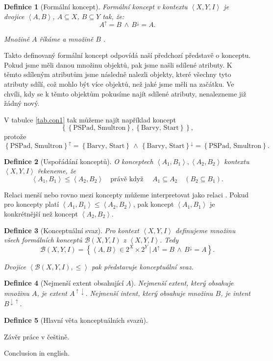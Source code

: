 \documentclass[12pt]{article}
\newcommand{\sep}{\,|\,}
\newcommand{\pravekdyz}{\mbox{právě když }}
\newcommand{\adds}[1]{\left\{#1\right\}}
\newcommand{\addsp}[1]{\left<#1\right>}
\newcommand{\logand}{\,\wedge\,}
\newcommand{\context}{\addsp{X, Y, I}}
\newcommand{\lattice}{\mathcal{B}(X, Y, I)}
\newcommand{\AB}{\addsp{A, B}}
\newcommand{\up}{^{\uparrow}}
\newcommand{\down}{^{\downarrow}}
\newcommand{\updown}{^{\uparrow\downarrow}}
\newcommand{\downup}{^{\downarrow\uparrow}}
\newtheorem{mydef}{Definice}
\begin{document}
\begin{mydef}[Formální koncept]
Formální koncept v kontextu $\context$ je dvojice $\AB$, $A\subseteq X$, $B\subseteq Y$ tak, že:
$$A\up=B\logand B\down =A.$$

Množině $A$ říkáme  a množině $B$ .
\end{mydef}

Takto definovaný formální koncept odpovídá naší předchozí představě o konceptu. Pokud jsme měli danou množinu objektů, pak jsme našli sdílené atributy. K těmto sdíleným atributům jsme následně nalezli objekty, které všechny tyto atributy sdílí, což mohlo být více objektů, než jaké jsme měli na začátku. Ve chvíli, kdy se k těmto objektům pokusíme najít sdílené atributy, nenalezneme již žádný nový.

V tabulce \ref{tab.con1} tak můžeme najít například koncept 
$$\adds{\adds{\mbox{PSPad, Smultron}}, \adds{\mbox{Barvy, Start}}},$$ 
protože 
$$\adds{\mbox{PSPad, Smultron}}\up=\adds{\mbox{Barvy, Start}} \logand \adds{\mbox{Barvy, Start}}\down=\adds{\mbox{PSPad, Smultron}}.$$


\begin{mydef}[Uspořádání konceptů]
\label{def.order}
O konceptech $\addsp{A_1, B_1}, \addsp{A_2, B_2}$ kontextu $\context$ řekeneme, že
$$\addsp{A_1, B_1}\le\addsp{A_2, B_2}\quad\pravekdyz\quad A_1\subseteq A_2 \quad(B_2\subseteq B_1).$$
\end{mydef}

Relaci menší nebo rovno mezi koncepty můžeme interpretovat jako relaci . Pokud pro koncepty platí $\addsp{A_1, B_1}\le\addsp{A_2, B_2}$, pak koncept $\addsp{A_1, B_1}$ je konkrétnější než koncept $\addsp{A_2, B_2}$. 

\begin{mydef}[Konceptuální svaz]
Pro kontext $\context$ definujeme množinu všech formálních konceptů $\lattice$ z $\context$. Tedy
$$\lattice=\adds{\addsp{A, B}\in 2^X\times 2^Y\sep A\up=B\logand B\down=A}.$$

Dvojice $\addsp{\lattice, \le}$ pak představuje konceptuální svaz. 
\end{mydef}

\begin{mydef}[Nejmenší extent obsahující $A$]
Nejmenší extent, který obsahuje množinu $A$, je extent $A\updown$. Nejmenší intent, který obsahuje množinu $B$, je intent $B\downup$. 
\end{mydef}

\begin{mydef}[Hlavní věta konceptuálních svazů]

\end{mydef}

\begin{conclusions-cz}
  Závěr práce v češtině.
\end{conclusions-cz}


\begin{conclusions-en}
  Conclusion in english.
\end{conclusions-en}
\end{document}
